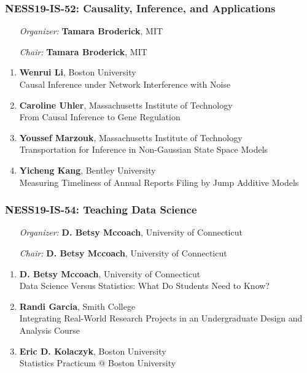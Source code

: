 \subsubsection*{NESS19-IS-52: Causality, Inference, and Applications}

\begin{enumerate}[align=left]
\item [\emph{Organizer:}] \textbf{Tamara Broderick}, MIT \\
\item [\emph{Chair:}] \textbf{Tamara Broderick}, MIT
\end{enumerate}

\begin{enumerate}
\item \textbf{Wenrui Li}, Boston University \\
Causal Inference under Network Interference with Noise
\item \textbf{Caroline Uhler}, Massachusetts Institute of Technology \\
From Causal Inference to Gene Regulation
\item \textbf{Youssef Marzouk}, Massachusetts Institute of Technology \\
Transportation for Inference in Non-Gaussian State Space Models
\item \textbf{Yicheng Kang}, Bentley University \\
Measuring Timeliness of Annual Reports Filing by Jump Additive Models
\end{enumerate}

\subsubsection*{NESS19-IS-54: Teaching Data Science}

\begin{enumerate}[align=left]
\item [\emph{Organizer:}] \textbf{D. Betsy Mccoach}, University of Connecticut \\
\item [\emph{Chair:}] \textbf{D. Betsy Mccoach}, University of Connecticut
\end{enumerate}

\begin{enumerate}
\item \textbf{D. Betsy Mccoach}, University of Connecticut \\
Data Science Versus Statistics: What Do Students Need to Know?
\item \textbf{Randi Garcia}, Smith College \\
Integrating Real-World Research Projects in an Undergraduate Design and Analysis Course
\item \textbf{Eric D. Kolaczyk}, Boston University \\
Statistics Practicum @ Boston University
\end{enumerate}

